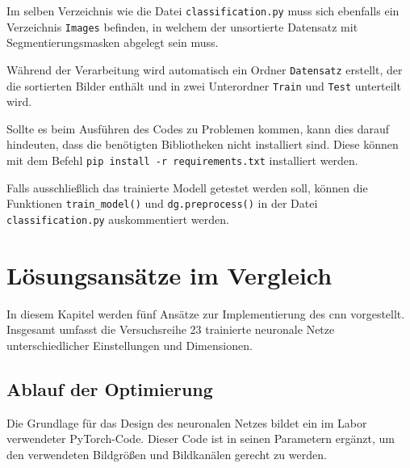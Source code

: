 \documentclass[journal,twoside,web]{ieeecolor}
\begin{document}
Im selben Verzeichnis wie die Datei \texttt{classification.py} muss sich ebenfalls ein Verzeichnis \texttt{Images} befinden, in welchem der unsortierte Datensatz mit Segmentierungsmasken abgelegt sein muss.

Während der Verarbeitung wird automatisch ein Ordner \texttt{Datensatz} erstellt, der die sortierten Bilder enthält und in zwei Unterordner \texttt{Train} und \texttt{Test} unterteilt wird.

Sollte es beim Ausführen des Codes zu Problemen kommen, kann dies darauf hindeuten, dass die benötigten Bibliotheken nicht installiert sind. Diese können mit dem Befehl \texttt{pip install -r requirements.txt} installiert werden.

Falls ausschließlich das trainierte Modell getestet werden soll, können die Funktionen \texttt{train\_model()} und \texttt{dg.preprocess()} in der Datei \texttt{classification.py} auskommentiert werden.


\section{Lösungsansätze im Vergleich}
In diesem Kapitel werden fünf Ansätze zur Implementierung des \ac{cnn} vorgestellt. Insgesamt umfasst die Versuchsreihe 23 trainierte neuronale Netze unterschiedlicher Einstellungen und Dimensionen.


\subsection{Ablauf der Optimierung}
\label{sec:optimization}
Die Grundlage für das Design des neuronalen Netzes bildet ein im Labor verwendeter PyTorch-Code. Dieser Code ist in seinen Parametern ergänzt, um den verwendeten Bildgrößen und Bildkanälen gerecht zu werden. 
\end{document}
